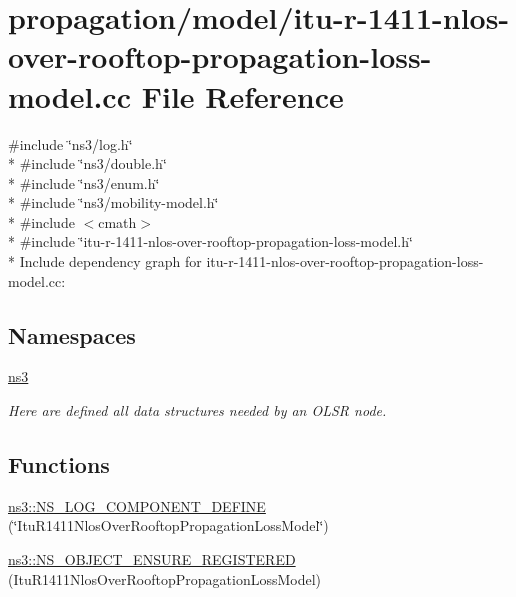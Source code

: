 \hypertarget{itu-r-1411-nlos-over-rooftop-propagation-loss-model_8cc}{}\section{propagation/model/itu-\/r-\/1411-\/nlos-\/over-\/rooftop-\/propagation-\/loss-\/model.cc File Reference}
\label{itu-r-1411-nlos-over-rooftop-propagation-loss-model_8cc}
{\ttfamily \#include \char`\"{}ns3/log.\+h\char`\"{}}\\*
{\ttfamily \#include \char`\"{}ns3/double.\+h\char`\"{}}\\*
{\ttfamily \#include \char`\"{}ns3/enum.\+h\char`\"{}}\\*
{\ttfamily \#include \char`\"{}ns3/mobility-\/model.\+h\char`\"{}}\\*
{\ttfamily \#include $<$cmath$>$}\\*
{\ttfamily \#include \char`\"{}itu-\/r-\/1411-\/nlos-\/over-\/rooftop-\/propagation-\/loss-\/model.\+h\char`\"{}}\\*
Include dependency graph for itu-\/r-\/1411-\/nlos-\/over-\/rooftop-\/propagation-\/loss-\/model.cc\+:
\subsection*{Namespaces}
\begin{DoxyCompactItemize}
\item 
 \hyperlink{namespacens3}{ns3}
\begin{DoxyCompactList}\small\item\em Here are defined all data structures needed by an O\+L\+SR node. \end{DoxyCompactList}\end{DoxyCompactItemize}
\subsection*{Functions}
\begin{DoxyCompactItemize}
\item 
\hyperlink{namespacens3_ab9d0820ec2b3c447340f6be79bd2818a}{ns3\+::\+N\+S\+\_\+\+L\+O\+G\+\_\+\+C\+O\+M\+P\+O\+N\+E\+N\+T\+\_\+\+D\+E\+F\+I\+NE} (\char`\"{}Itu\+R1411\+Nlos\+Over\+Rooftop\+Propagation\+Loss\+Model\char`\"{})
\item 
\hyperlink{namespacens3_ab8ef252aabd986ab234baf61f67dba82}{ns3\+::\+N\+S\+\_\+\+O\+B\+J\+E\+C\+T\+\_\+\+E\+N\+S\+U\+R\+E\+\_\+\+R\+E\+G\+I\+S\+T\+E\+R\+ED} (Itu\+R1411\+Nlos\+Over\+Rooftop\+Propagation\+Loss\+Model)
\end{DoxyCompactItemize}
